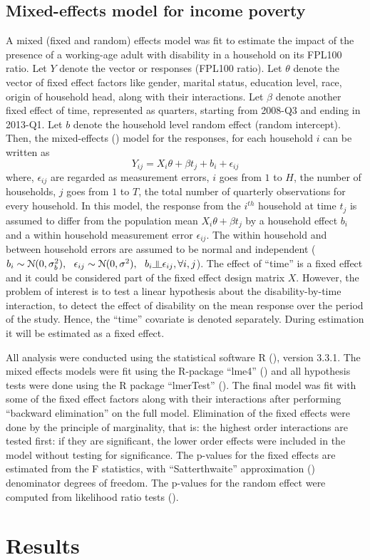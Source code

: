 \documentclass[11pt]{extarticle} %
\begin{document}
\subsection{Mixed-effects model for income poverty}
A mixed (fixed and random) effects model was fit to estimate the impact of the presence of a working-age adult with disability in a household on its FPL100 ratio. Let $Y$ denote the vector or responses (FPL100 ratio). Let $\theta$ denote the vector of fixed effect factors like gender, marital status, education level, race, origin of household head, along with their interactions. Let $\beta$ denote another fixed effect of time, represented as quarters, starting from 2008-Q3 and ending in 2013-Q1. Let $b$ denote the household level random effect (random intercept). Then, the mixed-effects (\cite{Fitzmaurice_2012_Applied}) model for the responses, for each household $i$ can be written as
\begin{equation}
Y_{ij} = X_i\theta + \beta t_j + b_i + \epsilon_{ij}
\end{equation}
where, $\epsilon_{ij}$ are regarded as measurement errors, $i$ goes from $1$ to $H$, the number of households, $j$ goes from $1$ to $T$, the total number of quarterly observations for every household. In this model, the response from the $i^{th}$ household at time $t_j$ is assumed to differ from the population mean $X_i\theta + \beta t_j$ by a household effect $b_i$ and a within household measurement error $\epsilon_{ij}$. The within household and between household errors are assumed to be normal and independent ($b_i \sim \N(0, \sigma^2_b),\ \ \epsilon_{ij} \sim \N(0, \sigma^2), \ \ b_i \indep \epsilon_{ij}, \forall i, j$). The effect of ``time'' is a fixed effect and it could be considered part of the fixed effect design matrix $X$. However, the problem of interest is to test a linear hypothesis about the disability-by-time interaction, to detect the effect of disability on the mean response over the period of the study. Hence, the ``time'' covariate is denoted separately. During estimation it will be estimated as a fixed effect. 

All analysis were conducted using the statistical software R (\cite{R}), version 3.3.1. The mixed effects models were fit using the R-package ``lme4'' (\cite{R-lme4}) and all hypothesis tests were done using the R package ``lmerTest'' (\cite{Kuznetsova_etal_2015_R-lmerTest}). The final model was fit with some of the fixed effect factors along with their interactions after performing ``backward elimination'' on the full model. Elimination of the fixed effects were done by the principle of marginality, that is: the highest order interactions are tested first: if they are significant, the lower order effects were included in the model without testing for significance. The p-values for the fixed effects are estimated from the F statistics, with ``Satterthwaite'' approximation (\cite{Satterthwaite_1946_Biometrics}) denominator degrees of freedom. The p-values for the random effect were computed from likelihood ratio tests (\cite{Morrell_1998_Biometrics}). 


\section{Results}


\newpage

\end{document}
